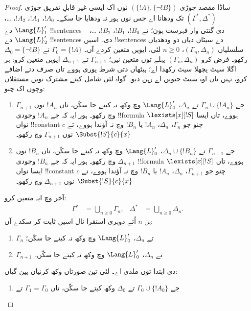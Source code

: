 \documentclass[../../../include/open-logic-section]{subfiles}
\begin{document}
\begin{proof}
ساڈا مقصد جوڑی $(\{ !A \}, \{\lnot!B\})$
نوں اک ایسی غیر قابلِ تفریق جوڑی
$(\Gamma^*, \Delta^*)$ تک ودھانا اے
جس نوں ہور نہ ودھایا جا سکے۔
$!A_0$، $!A_1$، $!A_2$، \dots،
$\Lang{L}'_1$ دے !!{sentence}s دی
گنتی وار فہرست ہون؛ تے $!B_0$،
$!B_1$، $!B_2$، \dots،
~$\Lang{L}'_2$ دے !!{sentence}s دی۔
اسیں !!{sentence}s دے سیٹاں دیاں دو
ودھدیاں سلسلیاں $(\Gamma_n, \Delta_n)$،
$n \ge 0$ لئی، ایویں متعین کردے آں۔
$\Gamma_0 = \{ !A\}$ تے
$\Delta_0 = \{\lnot !B \}$ رکھو۔
فرض کرو $(\Gamma_n, \Delta_n)$ پہلے
توں متعین نیں؛ $\Gamma_{n+1}$ تے
$\Delta_{n+1}$ ایویں متعین کرو:
ہر اگلا سیٹ پچھلا سیٹ رکھدا اے؛ ہیٹھاں دتی شرط
پوری ہووے تاں صرف دتے اضافے کرو، نہیں تاں اوہ سیٹ
جیویں اے رہن دیو۔ گواہ لئی شامل کیتے مشترک نویں
مستقلاں وچوں اک چنو:
\begin{enumerate}
\item جے $\Gamma_n \cup \{!A_n \}$ تے
  $\Delta_n$، $\Lang{L}'_0$ وچ
  وکھ نہ کیتے جا سکّن، تاں $!A_n$ نوں
  $\Gamma_{n+1}$ وچ رکھو۔ ہور ایہ کہ جے
  $!A_n$ وجودی !!{formula}
  $\lexists[x][!S]$ ہووے، تاں ایسا نواں
  !!{constant} $c$ چنو جو
  $\Gamma_n$، $\Delta_n$، $!A_n$ یا
  $!B_n$ وچ نہ آؤندا ہووے، تے
  $\Subst{!S}{c}{x}$ نوں
  $\Gamma_{n+1}$ وچ رکھو۔
\item جے $\Gamma_{n+1}$ تے
  $\Delta_n \cup \{!B_n \}$،
  $\Lang{L}'_0$ وچ وکھ نہ کیتے جا سکّن،
  تاں $!B_n$ نوں $\Delta_{n+1}$ وچ رکھو۔
  ہور ایہ کہ جے $!B_n$ وجودی
  !!{formula} $\lexists[x][!S]$ ہووے،
  تاں ایسا نواں !!{constant} $c$
  چنو جو $\Gamma_{n+1}$، $\Delta_n$،
  $!A_n$ یا $!B_n$ وچ نہ آؤندا ہووے،
  تے $\Subst{!S}{c}{x}$ نوں
  $\Delta_{n+1}$ وچ رکھو۔
\end{enumerate}
آخر وچ ایہ متعین کرو:
\begin{align*}
  \Gamma^* & = \bigcup_{n\ge 0} \Gamma_n, & 
  \Delta^* & = \bigcup_{n\ge 0} \Delta_n.
\end{align*}
ہن $n$ اُتے دوہری استقرا نال
اسیں ثابت کر سکدے آں:
\begin{enumerate}
\item{} $\Gamma_n$ تے
  $\Delta_n$، $\Lang{L}'_0$
  وچ وکھ نہ کیتے جا سکّن؛
\item{} $\Gamma_{n+1}$
  تے $\Delta_n$، $\Lang{L}'_0$
  وچ وکھ نہ کیتے جا سکّن۔
\end{enumerate}
 دی ابتدا
 توں ملدی اے۔
 لئی تین صورتاں
وکھ کرنیاں پین گیاں:
\begin{enumerate}
\item جے $\Gamma_0 \cup \{!A_0 \}$
  تے $\Delta_0$ وکھ کیتے جا سکّن،
  تاں $\Gamma_1 = \Gamma_0$ تے

\end{enumerate}
\end{proof}
\end{document}
